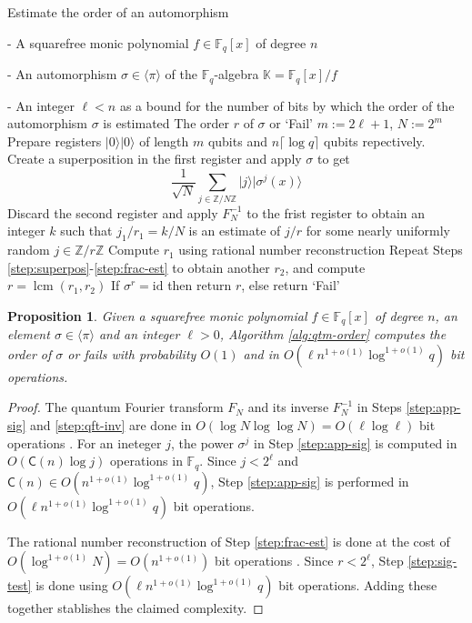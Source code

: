 \documentclass{article}
\theoremstyle{plain}
\newtheorem{proposition}[theorem]{Proposition}
\theoremstyle{definition}
\newcommand{\algbox}[1]{
	\begin{tcolorbox}[width = 0.8\textwidth, colback = white, arc = 2pt, boxrule = 0.5pt] 
		#1 
	\end{tcolorbox}
}
\newcommand{\lrang}[1]{\langle#1\rangle}
\newcommand{\ldbrac}[1]{\lvert#1\rangle}
\DeclareMathOperator{\lcm}{lcm} %
\def\K{\ensuremath{\mathbb{K}}}
\def\Z{\ensuremath{\mathbb{Z}}}
\def\F{\ensuremath{\mathbb{F}}}
\def\CC{\ensuremath{\mathsf{C}}}
\begin{document}
\begin{algorithm}[t]
	\caption{Estimate the order of an automorphism}
	\label{alg:qtm-order}
	\centering
	\algbox{
	\begin{algorithmic}[1]
		\Require 
		\item[-] A squarefree monic polynomial $f \in \F_q[x]$ of degree $n$
		\item[-] An automorphism $\sigma \in \lrang{\pi}$ of the $\F_q$-algebra $\K = \F_q[x] / f$
		\item[-] An integer $\ell < n$ as a bound for the number of bits by which the order of the 
		automorphism $\sigma$ is estimated
		\Ensure The order $r$ of $\sigma$ or `Fail'
		\State $m := 2\ell + 1$, $N := 2^m$
		\State\label{step:superpos}Prepare registers $\ldbrac{0}\ldbrac{0}$ of length $m$ qubits 
		and $n\lceil \log q \rceil$ qubits repectively.
		\State\label{step:app-sig}Create a superposition in the first register and apply $\sigma$ 
		to get
		\[ \frac{1}{\sqrt{N}} \sum_{j \in \Z/N\Z} \ldbrac{j}\ldbrac{\sigma^j(x)} \]
		\State\label{step:qft-inv}Discard the second register and apply $F_N^{-1}$ to the frist 
		register to obtain an integer $k$ such that $j_1 / r_1 = k / N$ is an estimate of $j / r$ 
		for some nearly uniformly random $j \in \Z/r\Z$
		\State\label{step:frac-est}Compute $r_1$ using rational number reconstruction
		\State Repeat Steps \ref{step:superpos}-\ref{step:frac-est} to obtain another $r_2$, 
		and compute $r = \lcm(r_1, r_2)$
		\State\label{step:sig-test} If $\sigma^r = \text{id}$ then return $r$, else return `Fail'
	\end{algorithmic}}
\end{algorithm}

\begin{proposition}
	Given a squarefree monic polynomial $f \in \F_q[x]$ of degree $n$, an element $\sigma \in 
	\lrang{\pi}$ and an integer $\ell > 0$, Algorithm \ref{alg:qtm-order} computes the order of 
	$\sigma$ or fails with probability $O(1)$ and in $O(\ell n^{1 + o(1)}\log^{1 + o(1)}q)$ bit 
	operations.
\end{proposition}
\begin{proof}
	The quantum Fourier transform $F_N$ and its inverse $F_N^{-1}$ in Steps \ref{step:app-sig} 
	and \ref{step:qft-inv} are done in $O(\log N \log\log N) = O(\ell\log\ell)$ bit operations 
	\cite{cleve1998quantum, childs2010quantum}. For an ineteger $j$, the power $\sigma^j$ in Step 
	\ref{step:app-sig} is computed in $O(\CC(n)\log j)$ operations in $\F_q$. Since $j < 2^\ell$ 
	and $\CC(n) \in O(n^{1 + o(1)}\log^{1 + o(1)}q)$, Step \ref{step:app-sig} is performed in 
	$O(\ell n^{1 + o(1)}\log^{1 + o(1)}q)$ bit operations.
	
	The rational number reconstruction of Step \ref{step:frac-est} is done at the cost of 
	$O(\log^{1 + o(1)}N) = O(n^{1 + o(1)})$ bit operations \cite{pan2002acceleration}. Since $r < 
	2^\ell$, Step \ref{step:sig-test} is done using $O(\ell n^{1 + o(1)}\log^{1 + o(1)}q)$ bit 
	operations. Adding these together stablishes the claimed complexity.
\end{proof}
\end{document}
